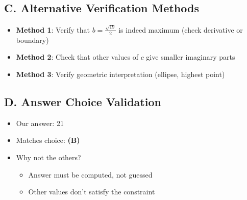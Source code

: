 \documentclass[11pt]{article}
\begin{document}
\begin{verificationbox}
\subsection*{C. Alternative Verification Methods}
\begin{itemize}[leftmargin=*]
    \item \textbf{Method 1}: Verify that $b = \frac{\sqrt{19}}{2}$ is indeed maximum (check derivative or boundary)
    \item \textbf{Method 2}: Check that other values of $c$ give smaller imaginary parts
    \item \textbf{Method 3}: Verify geometric interpretation (ellipse, highest point)
\end{itemize}

\subsection*{D. Answer Choice Validation}
\begin{itemize}[leftmargin=*]
    \item Our answer: 21
    \item Matches choice: \textbf{(B)}
    \item Why not the others?
    \begin{itemize}
        \item Answer must be computed, not guessed
        \item Other values don't satisfy the constraint
    \end{itemize}
\end{itemize}
\end{verificationbox}
\end{document}
